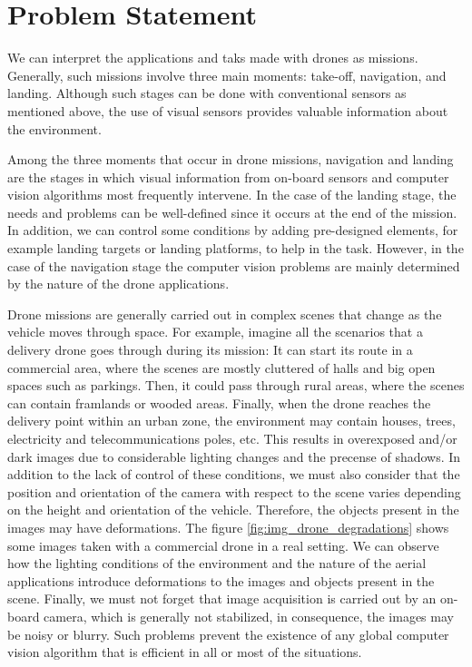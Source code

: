 \section*{Problem Statement}
 
We can interpret the applications and taks made with drones as missions. Generally, such missions involve three main moments: take-off, navigation, and landing. Although such stages can be done with conventional sensors as mentioned above, the use of visual sensors provides valuable information about the environment. 

Among the three moments that occur in drone missions, navigation and landing are the stages in which visual information from on-board sensors and computer vision algorithms most frequently intervene. In the case of the landing stage, the needs and problems can be well-defined since it occurs at the end of the mission. In addition, we can control some conditions by adding pre-designed elements, for example landing targets or landing platforms, to help in the task. However, in the case of the navigation stage the computer vision problems are mainly determined by the nature of the drone applications. 

Drone missions are generally carried out in complex scenes that change as the vehicle moves through space. For example, imagine all the scenarios that a delivery drone goes through during its mission: It can start its route in a commercial area, where the scenes are mostly cluttered of halls and big open spaces such as parkings. Then, it could pass through rural areas, where the scenes can contain framlands or wooded areas. Finally, when the drone reaches the delivery point within an urban zone, the environment may contain houses, trees, electricity and telecommunications poles, etc. This results in overexposed and/or dark images due to considerable lighting changes and the precense of shadows. In addition to the lack of control of these conditions, we must also consider that the position and orientation of the camera with respect to the scene varies depending on the height and orientation of the vehicle. Therefore, the objects present in the images may have deformations. The figure \ref{fig:img_drone_degradations} shows some images taken with a commercial drone in a real setting. We can observe how the lighting conditions of the environment and the nature of the aerial applications introduce deformations to the images and objects present in the scene. Finally, we must not forget that image acquisition is carried out by an on-board camera, which is generally not stabilized, in consequence, the images may be noisy or blurry. Such problems prevent the existence of any global computer vision algorithm that is efficient in all or most of the situations. 


